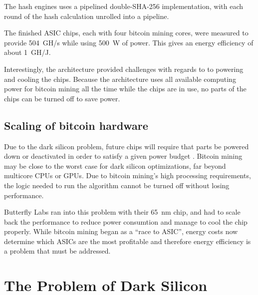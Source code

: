 The hash engines uses a pipelined double-SHA-256 implementation, with each round of the hash calculation
unrolled into a pipeline.

The finished ASIC chips, each with four bitcoin mining cores, were measured to provide 504~GH/s while using
500~W of power. This gives an energy efficiency of about 1~GH/J.

Interestingly, the architecture provided challenges with regards to to powering and cooling the chips.
Because the architecture uses all available computing power for bitcoin mining all the time while
the chips are in use, no parts of the chips can be turned off to save power. \cite{goldstrike}


\subsection{Scaling of bitcoin hardware}
Due to the dark silicon problem, future chips will require that parts be powered down or deactivated
in order to satisfy a given power budget \cite{dark-silicon2}. Bitcoin mining may be close to
the worst case for dark silicon optimizations, far beyond multicore CPUs or GPUs. Due to bitcoin
mining's high processing requirements, the logic needed to run the algorithm cannot be turned off without losing
performance.

Butterfly Labs ran into this problem with their 65~nm chip, and had to scale back the performance to reduce power consumtion
and manage to cool the chip properly. While bitcoin mining began as a ``race to ASIC'', energy costs now determine
which ASICs are the most profitable and therefore energy efficiency is a problem that must be addressed. \cite{bespoke-silicon}

%


\section{The Problem of Dark Silicon}
\label{sec:dark-silicon}

